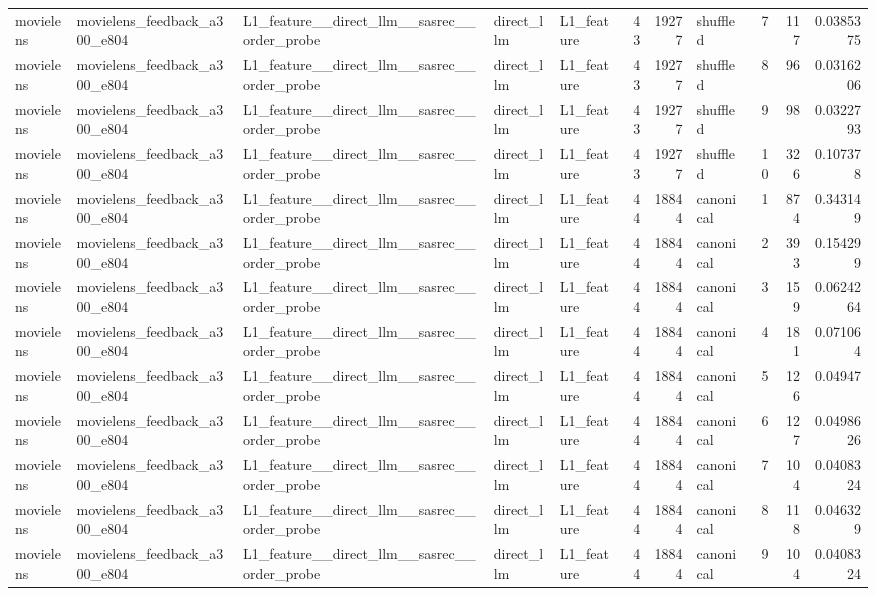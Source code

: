 \begin{table}[htbp!]
\begin{tabular}{lllllrrlrrr}
movielens & movielens\_feedback\_a300\_e804 & L1\_feature\_\_direct\_llm\_\_sasrec\_\_order\_probe & direct\_llm & L1\_feature & 43 & 19277 & shuffled & 7 & 117 & 0.0385375 \\
movielens & movielens\_feedback\_a300\_e804 & L1\_feature\_\_direct\_llm\_\_sasrec\_\_order\_probe & direct\_llm & L1\_feature & 43 & 19277 & shuffled & 8 & 96 & 0.0316206 \\
movielens & movielens\_feedback\_a300\_e804 & L1\_feature\_\_direct\_llm\_\_sasrec\_\_order\_probe & direct\_llm & L1\_feature & 43 & 19277 & shuffled & 9 & 98 & 0.0322793 \\
movielens & movielens\_feedback\_a300\_e804 & L1\_feature\_\_direct\_llm\_\_sasrec\_\_order\_probe & direct\_llm & L1\_feature & 43 & 19277 & shuffled & 10 & 326 & 0.107378 \\
movielens & movielens\_feedback\_a300\_e804 & L1\_feature\_\_direct\_llm\_\_sasrec\_\_order\_probe & direct\_llm & L1\_feature & 44 & 18844 & canonical & 1 & 874 & 0.343149 \\
movielens & movielens\_feedback\_a300\_e804 & L1\_feature\_\_direct\_llm\_\_sasrec\_\_order\_probe & direct\_llm & L1\_feature & 44 & 18844 & canonical & 2 & 393 & 0.154299 \\
movielens & movielens\_feedback\_a300\_e804 & L1\_feature\_\_direct\_llm\_\_sasrec\_\_order\_probe & direct\_llm & L1\_feature & 44 & 18844 & canonical & 3 & 159 & 0.0624264 \\
movielens & movielens\_feedback\_a300\_e804 & L1\_feature\_\_direct\_llm\_\_sasrec\_\_order\_probe & direct\_llm & L1\_feature & 44 & 18844 & canonical & 4 & 181 & 0.071064 \\
movielens & movielens\_feedback\_a300\_e804 & L1\_feature\_\_direct\_llm\_\_sasrec\_\_order\_probe & direct\_llm & L1\_feature & 44 & 18844 & canonical & 5 & 126 & 0.04947 \\
movielens & movielens\_feedback\_a300\_e804 & L1\_feature\_\_direct\_llm\_\_sasrec\_\_order\_probe & direct\_llm & L1\_feature & 44 & 18844 & canonical & 6 & 127 & 0.0498626 \\
movielens & movielens\_feedback\_a300\_e804 & L1\_feature\_\_direct\_llm\_\_sasrec\_\_order\_probe & direct\_llm & L1\_feature & 44 & 18844 & canonical & 7 & 104 & 0.0408324 \\
movielens & movielens\_feedback\_a300\_e804 & L1\_feature\_\_direct\_llm\_\_sasrec\_\_order\_probe & direct\_llm & L1\_feature & 44 & 18844 & canonical & 8 & 118 & 0.046329 \\
movielens & movielens\_feedback\_a300\_e804 & L1\_feature\_\_direct\_llm\_\_sasrec\_\_order\_probe & direct\_llm & L1\_feature & 44 & 18844 & canonical & 9 & 104 & 0.0408324 \\

\end{tabular}
\end{table}
